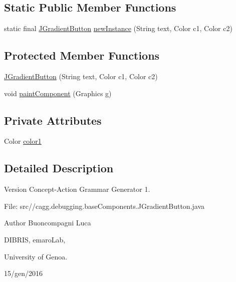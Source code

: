 \subsection*{Static Public Member Functions}
\begin{DoxyCompactItemize}
\item 
static final \hyperlink{classit_1_1emarolab_1_1cagg_1_1debugging_1_1baseComponents_1_1JGradientButton}{J\-Gradient\-Button} \hyperlink{classit_1_1emarolab_1_1cagg_1_1debugging_1_1baseComponents_1_1JGradientButton_ad6443cd2596a1d1833d0dccd22527aed}{new\-Instance} (String text, Color c1, Color c2)
\end{DoxyCompactItemize}
\subsection*{Protected Member Functions}
\begin{DoxyCompactItemize}
\item 
\hyperlink{classit_1_1emarolab_1_1cagg_1_1debugging_1_1baseComponents_1_1JGradientButton_a18263e3e57f0d59529f39c7f8383ca84}{J\-Gradient\-Button} (String text, Color c1, Color c2)
\item 
void \hyperlink{classit_1_1emarolab_1_1cagg_1_1debugging_1_1baseComponents_1_1JGradientButton_ac118d257640e8a6c388738258f5f610c}{paint\-Component} (Graphics g)
\end{DoxyCompactItemize}
\subsection*{Private Attributes}
\begin{DoxyCompactItemize}
\item 
Color \hyperlink{classit_1_1emarolab_1_1cagg_1_1debugging_1_1baseComponents_1_1JGradientButton_a961f22db3c356cd89f00cb2003439906}{color1}
\end{DoxyCompactItemize}


\subsection{Detailed Description}
\begin{DoxyVersion}{Version}
Concept-\/\-Action Grammar Generator 1. \par
 File\-: src//cagg.debugging.\-base\-Components.\-J\-Gradient\-Button.\-java \par

\end{DoxyVersion}
\begin{DoxyAuthor}{Author}
Buoncompagni Luca \par
 D\-I\-B\-R\-I\-S, emaro\-Lab,\par
 University of Genoa. \par
 15/gen/2016 \par

\end{DoxyAuthor}


